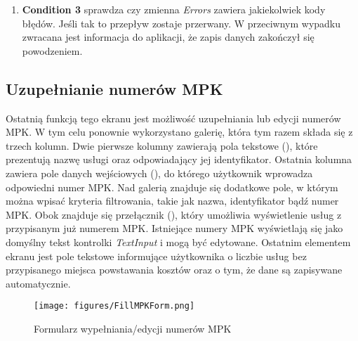 \begin{enumerate}
\begin{itemize}
    \item  \textbf{Replace Template Data} -- wstawia wybrane informacje do szablonu żądania HTTP.
    \item \textbf{batchData} -- w kroku tym, znaki specjalne są zakodowane procentowo\footnote{\emph{Kodowanie procentowe} -- metoda reprezentowania znaków specjalnych w adresach URL w formie zgodnej z protokołem HTTP. Polega na zastępowaniu niebezpiecznych lub niedozwolonych znaków ich odpowiednikami w postaci procentowego kodu, który składa się z symbolu "\%" i dwóch cyfr szesnastkowych reprezentujących kod ASCII danego znaku.} (znane również jako \emph{kodowanie URL}). Jest to wymagane aby uniknąć błędów. 
    \item \textbf{Send Batch Request} -- wysyła żądanie aktualizacji danych do SharePoint.
    \item \textbf{Assign result of send batch data to Error var} -- przypisuje odpowiedź serwera na wysłane żądanie w celu późniejszej analizy.
    \end{itemize}
    
    \item \textbf{Condition 3} sprawdza czy zmienna \emph{Errors} zawiera jakiekolwiek kody błędów. Jeśli tak to przepływ zostaje przerwany. W przeciwnym wypadku zwracana jest informacja do aplikacji, że zapis danych zakończył się powodzeniem.
\end{enumerate}

\subsection{Uzupełnianie numerów MPK}
Ostatnią funkcją tego ekranu jest możliwość uzupełniania lub edycji numerów MPK. W tym celu ponownie wykorzystano galerię, która tym razem składa się z trzech kolumn. Dwie pierwsze kolumny zawierają pola tekstowe (), które prezentują nazwę usługi oraz odpowiadający jej identyfikator. Ostatnia kolumna zawiera pole danych wejściowych (), do którego użytkownik wprowadza odpowiedni numer MPK. Nad galerią znajduje się dodatkowe pole, w którym można wpisać kryteria filtrowania, takie jak nazwa, identyfikator bądź numer MPK. Obok znajduje się przełącznik (), który umożliwia wyświetlenie usług z przypisanym już numerem MPK. Istniejące numery MPK wyświetlają się jako domyślny tekst kontrolki \emph{TextInput} i mogą być edytowane. Ostatnim elementem ekranu jest pole tekstowe informujące użytkownika o liczbie usług bez przypisanego miejsca powstawania kosztów oraz o tym, że dane są zapisywane automatycznie.
\begin{figure}[t]
    \centering
    \texttt{[image: figures/FillMPKForm.png]}
    \caption{Formularz wypełniania/edycji numerów MPK}
    \label{fig:fillmpkform}
\end{figure}